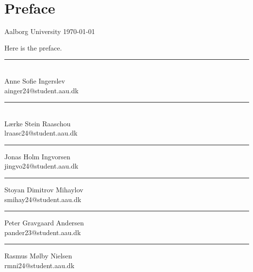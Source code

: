 \chapter*{Preface}
\raggedright \hfill Aalborg University \today

\vspace{3em}

\noindent Here is the preface.

\vspace{3cm}
\vfill\noindent
\begin{minipage}[b]{0.45\textwidth}
 \centering
 \rule{\textwidth}{0.5pt}\\
 Anne Sofie Ingerslev \\
 {\footnotesize ainger24@student.aau.dk}
\end{minipage}
\hfill
\begin{minipage}[b]{0.45\textwidth}
 \centering
 \rule{\textwidth}{0.45pt}\\
 Lærke Stein Raaschou \\
 {\footnotesize lraasc24@student.aau.dk}
\end{minipage}
\vspace{3\baselineskip}
\begin{center}
\begin{minipage}[b]{0.45\textwidth}
 \centering
 \rule{\textwidth}{0.45pt}
 Jonas Holm Ingvorsen \\
 {\footnotesize jingvo24@student.aau.dk}
\end{minipage}
\hfill
\begin{minipage}[b]{0.45\textwidth}
 \centering
 \rule{\textwidth}{0.5pt}
 Stoyan Dimitrov Mihaylov\\
 {\footnotesize smihay24@student.aau.dk}
\end{minipage}
\end{center}
\vspace{3\baselineskip}
\begin{center}
\begin{minipage}[b]{0.45\textwidth}
 \centering
 \rule{\textwidth}{0.45pt}
 Peter Gravgaard Andersen \\
 {\footnotesize pander23@student.aau.dk}
\end{minipage}
\hfill
\begin{minipage}[b]{0.45\textwidth}
 \centering
 \rule{\textwidth}{0.45pt}
 Rasmus Mølby Nielsen \\
 {\footnotesize rmni24@student.aau.dk}
\end{minipage}
\end{center}

